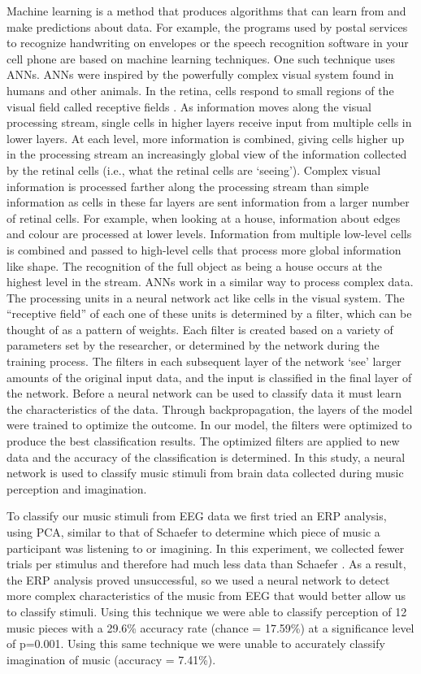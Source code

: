 Machine learning is a method that produces algorithms that can learn from and make predictions about data.
For example, the programs used by postal services to recognize handwriting on envelopes or the speech recognition software in your cell phone are based on machine learning techniques.
One such technique uses \acp{ANN}.
\acp{ANN} were inspired by the powerfully complex visual system found in humans and other animals.
In the retina, cells respond to small regions of the visual field called receptive fields \cite{Kalat2008}. 
As information moves along the visual processing stream, single cells in higher layers receive input from multiple cells in lower layers.
At each level, more information is combined, giving cells higher up in the processing stream an increasingly global view of the information collected by the retinal cells (i.e., what the retinal cells are `seeing').
Complex visual information is processed farther along the processing stream than simple information as cells in these far layers are sent information from a larger number of retinal cells.
For example, when looking at a house, information about edges and colour are processed at lower levels.
Information from multiple low-level cells is combined and passed to high-level cells that process more global information like shape. 
The recognition of the full object as being a house occurs at the highest level in the stream. 
\acp{ANN} work in a similar way to process complex data. 
The processing units in a neural network act like cells in the visual system.
The ``receptive field'' of each one of these units is determined by a filter, which can be thought of as a pattern of weights.
Each filter is created based on a variety of parameters set by the researcher, or determined by the network during the training process.
The filters in each subsequent layer of the network `see' larger amounts of the original input data, and the input is classified in the final layer of the network. 
Before a neural network can be used to classify data it must learn the characteristics of the data. 
Through backpropagation, the layers of the model were trained to optimize the outcome. 
In our model, the filters were optimized to produce the best classification results.
The optimized filters are applied to new data and the accuracy of the classification is determined. 
In this study, a neural network is used to classify music stimuli from brain data collected during music perception and imagination. 

To classify our music stimuli from EEG data we first tried an ERP analysis, using \ac{PCA}, similar to that of Schaefer \etal\citeyear{schaefer_name_2011} to determine which piece of music a participant was listening to or imagining.
In this experiment, we collected fewer trials per stimulus and therefore had much less data than Schaefer \etal\citeyear{schaefer_name_2011}. 
As a result, the ERP analysis proved unsuccessful, so we used a neural network to detect more complex characteristics of the music from EEG that would better allow us to classify stimuli.
Using this technique we were able to classify perception of 12 music pieces with a 29.6\% accuracy rate (chance = 17.59\%) at a significance level of p=0.001.
Using this same technique we were unable to accurately classify imagination of music (accuracy = 7.41\%). 